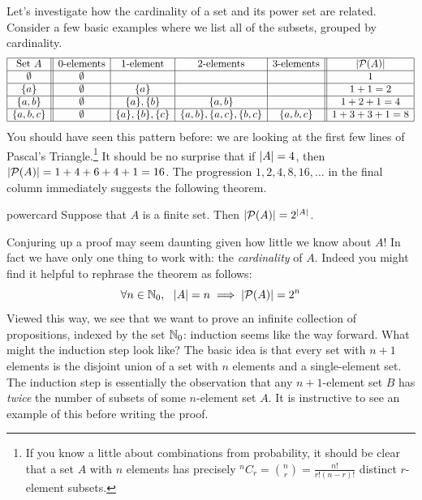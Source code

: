 Let's investigate how the cardinality of a set and its power set are related. Consider a few basic examples where we list all of the subsets, grouped by cardinality.
\[
	\begin{array}{|c||c|c|c|c||c|}
		\hline
		\text{Set }A&\text{0-elements}&\text{1-element}&\text{2-elements}&\text{3-elements}&\left| \mathcal{P}(A)\right|\\\hline
		\emptyset&\emptyset&&&&1\\\hline
		\{a\}&\emptyset&\{a\}&&&1+1=2\\\hline
		\{a,b\}&\emptyset&\{a\},\{b\}&\{a,b\}&&1+2+1=4\\\hline
		\{a,b,c\}&\emptyset&\{a\},\{b\},\{c\}&\{a,b\},\{a,c\},\{b,c\}&\{a,b,c\}&1+3+3+1=8\\\hline
	\end{array}
\]
You should have seen this pattern before: we are looking at the first few lines of Pascal's Triangle.\footnote{If you know a little about combinations from probability, it should be clear that a set $A$ with $n$ elements has precisely ${}^nC_r=\binom nr=\frac{n!}{r!(n-r)!}$ distinct $r$-element subsets.} It should be no surprise that if $\left| A\right|=4$, then $\left| \mathcal{P}(A)\right|=1+4+6+4+1=16$. The progression $1,2,4,8,16,\ldots$ in the final column immediately suggests the following theorem.

\begin{thm}{}{powercard}
	Suppose that $A$ is a finite set. Then $\left| \mathcal{P}(A)\right|=2^{\left| A\right|}$.
\end{thm}

Conjuring up a proof may seem daunting given how little we know about $A$! In fact we have only one thing to work with: the \emph{cardinality} of $A$. Indeed you might find it helpful to rephrase the theorem as follows:
\[
	\forall n\in\mathbb{N}_0,\ \ \left| A\right|=n\implies \left| \mathcal{P}(A)\right|=2^{n}
\]
Viewed this way, we see that we want to prove an infinite collection of propositions, indexed by the set $\mathbb{N}_0$:  induction seems like the way forward. What might the induction step look like? The basic idea is that every set with $n+1$ elements is the disjoint union of a set with $n$ elements and a single-element set. The induction step is essentially the observation that any $n+1$-element set $B$ has \emph{twice} the number of subsets of some $n$-element set $A$. It is instructive to see an example of this before writing the proof. 

